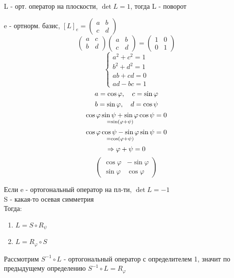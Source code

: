 \documentclass[12pt, fleqn]{article}
\begin{document}
	\tableofcontents
	\newpage
	
	
	
	
	
	
	

	\begin{definition}
		L - орт. оператор на плоскости, $\det L = 1$, тогда L - поворот
	\end{definition}

	e - ортнорм. базис, $[L]_e = \begin{pmatrix}
		a & b\\
		c & d
	\end{pmatrix}$
	\[\begin{pmatrix}
		a & c\\
		b & d
	\end{pmatrix} \begin{pmatrix}
		a & b\\
		c & d
	\end{pmatrix} = \begin{pmatrix}
		1 & 0\\
		0 & 1
	\end{pmatrix}\]
	\[\begin{cases}
		a^2 + c^2 = 1\\
		b^2 + d^2 = 1\\
		ab + cd = 0\\
		ad - bc = 1
	\end{cases}\]
	\[a = \cos \varphi,\quad c = \sin \varphi\]
	\[b = \sin \varphi,\quad d = \cos \psi\]
	\[\underset{= \sin(\varphi + \psi)}{\cos \varphi \sin \psi + \sin \varphi \cos \psi} = 0\]
	\[\underset{= \cos(\varphi + \psi)}{\cos \varphi \cos \psi - \sin \varphi \sin \psi} = 0\]
	\[\Rightarrow \varphi + \psi = 0\]
	\[\begin{pmatrix}
		\cos \varphi & - \sin \varphi\\
		\sin \varphi & \cos \varphi
	\end{pmatrix}\]

	\begin{definition}
		Если e - ортогональный оператор на пл-ти, $\det L = -1$\\
		S - какая-то осевая симметрия\\
		Тогда:
		\begin{enumerate}
			\item $L = S \circ R_{\psi}$
			\item $L = R_{\varphi} \circ S$
		\end{enumerate}
	\end{definition}

	Рассмотрим $S^{-1} \circ L$ - ортогональный оператор с определителем 1, значит по предыдущему определению $S^{-1} \circ L = R_{\varphi}$
\end{document}
